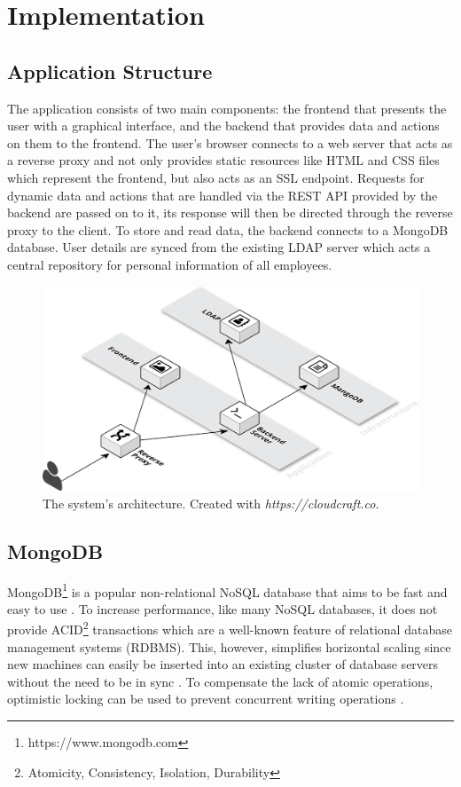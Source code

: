 \chapter{Implementation}
\section{Application Structure}
The application consists of two main components: the frontend that presents the user with a graphical interface, and the backend that provides data and actions on them to the frontend.
The user's browser connects to a web server that acts as a reverse proxy and not only provides static resources like HTML and CSS files which represent the frontend, but also acts as an SSL endpoint.
Requests for dynamic data and actions that are handled via the REST API provided by the backend are passed on to it, its response will then be directed through the reverse proxy to the client.
To store and read data, the backend connects to a MongoDB database. User details are synced from the existing LDAP server which acts a central repository for personal information of all employees.
\begin{figure}[H]
    \centering
    \includegraphics[width=\textwidth]{images/system_architecture.png}
    \caption[Illustration: System Architecture]{The system's architecture. Created with \textit{https://cloudcraft.co}.}
    \label{fig:markovchain}
\end{figure}

\newpage

\section{MongoDB}
MongoDB\footnote{https://www.mongodb.com} is a popular non-relational NoSQL database that aims to be fast and easy to use \cite[p. 10]{MongoGuide}. To increase performance, like many NoSQL databases, it does not provide ACID\footnote{Atomicity, Consistency, Isolation, Durability} transactions which are a well-known feature of relational database management systems (RDBMS). This, however, simplifies horizontal scaling since new machines can easily be inserted into an existing cluster of database servers without the need to be in sync \cite[p. 3]{MongoGuide}. To compensate the lack of atomic operations, optimistic locking can be used to prevent concurrent writing operations \cite{MongoLock}.

